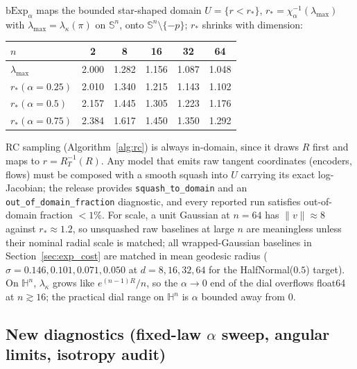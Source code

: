 \documentclass{article}
\theoremstyle{definition}
\theoremstyle{remark}
\newcommand{\bExp}{\mathrm{bExp}}
\newcommand{\SSS}{\mathbb{S}}
\newcommand{\HH}{\mathbb{H}}
\begin{document}
$\bExp_\alpha$ maps the bounded star-shaped domain $U=\{r<r_*\}$, $r_*=\chi_\alpha^{-1}(\lambda_{\max})$ with $\lambda_{\max}=\lambda_\kappa(\pi)$ on $\SSS^n$, onto $\SSS^n\setminus\{-p\}$; $r_*$ shrinks with dimension:
\begin{center}\small
\begin{tabular}{lccccc}
\toprule
$n$ & 2 & 8 & 16 & 32 & 64\\
\midrule
$\lambda_{\max}$ & 2.000 & 1.282 & 1.156 & 1.087 & 1.048\\
$r_*(\alpha{=}0.25)$ & 2.010 & 1.340 & 1.215 & 1.143 & 1.102\\
$r_*(\alpha{=}0.5)$  & 2.157 & 1.445 & 1.305 & 1.223 & 1.176\\
$r_*(\alpha{=}0.75)$ & 2.384 & 1.617 & 1.450 & 1.350 & 1.292\\
\bottomrule
\end{tabular}
\end{center}
RC sampling (Algorithm~\ref{alg:rc}) is always in-domain, since it draws $R$ first and maps to $r=R_T^{-1}(R)$. Any model that emits raw tangent coordinates (encoders, flows) must be composed with a smooth squash into $U$ carrying its exact log-Jacobian; the release provides \texttt{squash\_to\_domain} and an \texttt{out\_of\_domain\_fraction} diagnostic, and every reported run satisfies out-of-domain fraction $<1\%$. For scale, a unit Gaussian at $n{=}64$ has $\|v\|\approx8$ against $r_*\approx1.2$, so unsquashed raw baselines at large $n$ are meaningless unless their nominal radial scale is matched; all wrapped-Gaussian baselines in Section~\ref{sec:exp_cost} are matched in mean geodesic radius ($\sigma=0.146,0.101,0.071,0.050$ at $d=8,16,32,64$ for the HalfNormal($0.5$) target). On $\HH^n$, $\lambda_\kappa$ grows like $e^{(n-1)R}/n$, so the $\alpha\to0$ end of the dial overflows float64 at $n\gtrsim16$; the practical dial range on $\HH^n$ is $\alpha$ bounded away from $0$.

\subsection{New diagnostics (fixed-law $\alpha$ sweep, angular limits, isotropy audit)}
\label{app:diagnostics}
\end{document}
